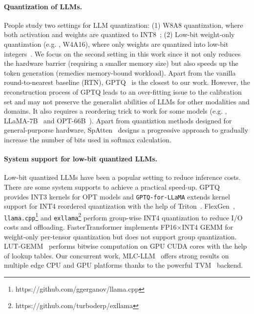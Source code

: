 \paragraph{Quantization of LLMs.} People study two settings for LLM quantization: (1) W8A8 quantization, where both activation and weights are quantized to INT8~\cite{dettmers2022llmint8, xiao2022smoothquant, zeroquant, outlier_suppression, wei2023outlier}; (2) Low-bit weight-only quantization (e.g. , W4A16), where only weights are quantized into low-bit integers~\cite{frantar2022gptq, dettmers2022case, sheng2023high, park2022nuqmm}. We focus on the second setting in this work since it not only reduces the hardware barrier (requiring a smaller memory size) but also speeds up the token generation (remedies memory-bound workload). Apart from the vanilla round-to-nearest baseline (RTN), GPTQ~\cite{frantar2022gptq} is the closest to our work. However, the reconstruction process of GPTQ leads to an over-fitting issue to the calibration set and may not preserve the generalist abilities of LLMs for other modalities and domains. It also requires a reordering trick to work for some models (e.g. , LLaMA-7B~\cite{touvron2023llama} and OPT-66B~\cite{opt}). Apart from quantiztion methods designed for general-purporse hardware, SpAtten~\cite{spatten} designs a progressive approach to gradually increase the number of bits used in softmax calculation.

\paragraph{System support for low-bit quantized LLMs. } Low-bit quantized LLMs have been a popular setting to reduce inference costs. There are some system supports to achieve a practical speed-up. GPTQ~\cite{frantar2022gptq} provides INT3 kernels for OPT models and \texttt{GPTQ-for-LLaMA} extends kernel support for INT4 reordered quantization with the help of Triton~\cite{tillet2019triton}. FlexGen~\cite{sheng2023high}, \texttt{llama.cpp}\footnote{https://github.com/ggerganov/llama.cpp} and \texttt{exllama}\footnote{https://github.com/turboderp/exllama} perform group-wise INT4 quantization to reduce I/O costs and offloading. FasterTransformer implements FP16$\times$INT4 GEMM for weight-only per-tensor quantization but does not support group quantization. LUT-GEMM~\cite{park2022nuqmm} performs bitwise computation on GPU CUDA cores with the help of lookup tables. Our concurrent work, MLC-LLM~\cite{mlc-llm} offers strong results on multiple edge CPU and GPU platforms thanks to the powerful TVM~\cite{chen2018tvm,feng2022tensorir} backend. 

